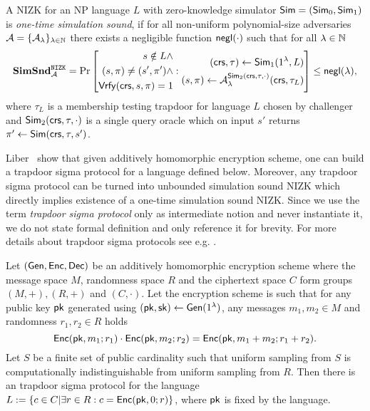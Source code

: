\begin{definition}
A NIZK for an NP language $L$ with zero-knowledge simulator $\mathsf{Sim} = (\mathsf{Sim}_0, \mathsf{Sim}_1)$ is \emph{one-time simulation sound}, if for all non-uniform polynomial-size adversaries $\mathcal{A} = \{\mathcal{A}_{\lambda}\}_{\lambda \in \mathbb{N}}$ there exists a negligible function $\mathsf{negl}(\cdot)$ such that for all $\lambda \in \mathbb{N}$ 
\[
\mathbf{SimSnd}_{\mathcal{A}}^{\mathtt{NIZK}} = \Pr\left[
\begin{aligned}
s \notin L \land \\
(s, \pi) \neq (s', \pi') \land \\
\mathsf{Vrfy}(\mathsf{crs}, s, \pi) = 1
\end{aligned}
:
\begin{aligned}
(\mathsf{crs}, \tau) \leftarrow \mathsf{Sim}_1(1{^{\lambda}}, L) \\
(s, \pi) \leftarrow \mathcal{A}_{\lambda}^{\mathsf{Sim}_2(\mathsf{crs}, \tau, \cdot)}(\mathsf{crs}, \tau_L)
\end{aligned} \right] \leq \mathsf{negl}(\lambda),
\]
where $\tau_L$ is a membership testing trapdoor for language $L$ chosen by challenger and $\mathsf{Sim}_2(\mathsf{crs}, \tau, \cdot)$ is a single query oracle which on input $s'$ returns $\pi' \leftarrow \mathsf{Sim}(\mathsf{crs}, \tau, s')$.
\end{definition}

Liber~\etal \cite{Libert2021OneShotFN} show that given additively homomorphic encryption scheme, one can build a trapdoor sigma protocol for a language defined below. Moreover, any trapdoor sigma protocol can be turned into unbounded simulation sound NIZK which directly implies existence of a one-time simulation sound NIZK. Since we use the term \emph{trapdoor sigma protocol} only as intermediate notion and never instantiate it, we do not state formal definition and only reference it for brevity. For more details about trapdoor sigma protocols see e.g. \cite{Libert2021OneShotFN}. 

\begin{lemma}\label{lem:tsp}
Let $(\mathsf{Gen}, \mathsf{Enc}, \mathsf{Dec})$ be an additively homomorphic encryption scheme where the message space $M$, randomness space $R$ and the ciphertext space $C$ form groups $(M, +), (R,+)$ and $(C, \cdot)$. Let the encryption scheme is such that for any public key $\mathsf{pk}$ generated using $(\mathsf{pk}, \mathsf{sk}) \leftarrow \mathsf{Gen}(1{^{\lambda}})$, any messages $m_1, m_2 \in M$ and randomness $r_1, r_2 \in R$ holds
\[\mathsf{Enc}(\mathsf{pk}, m_1;r_1) \cdot \mathsf{Enc}(\mathsf{pk}, m_2;r_2) = \mathsf{Enc}(\mathsf{pk}, m_1+m_2; r_1+r_2).\]
Let $S$ be a finite set of public cardinality such that uniform sampling from $S$ is computationally indistinguishable from uniform sampling from $R$. 
Then there is an trapdoor sigma protocol for the language $L:= \{c \in C| \exists r \in R: c = \mathsf{Enc}(\mathsf{pk}, 0; r)\}$, where $\mathsf{pk}$ is fixed by the language.  
\end{lemma}

